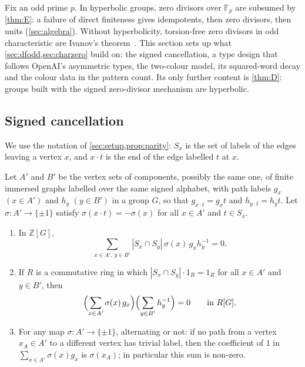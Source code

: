 \documentclass[11pt]{article}
\theoremstyle{definition}
\theoremstyle{plain}
\newcommand{\F}{\mathbb{F}}
\newcommand{\Z}{\mathbb{Z}}
\begin{document}
Fix an odd prime $p$. In hyperbolic groups, zero divisors over $\F_p$ are subsumed by \cref{thm:E}: a failure of direct finiteness gives idempotents, then zero divisors, then units (\cref{sec:algebra}). Without hyperbolicity, torsion-free zero divisors in odd characteristic are Ivanov's theorem~\cite[Thm.~1.1]{Ivanov2026}. This section sets up what \cref{sec:dfodd,sec:charzero} build on: the signed cancellation, a type design that follows OpenAI's asymmetric types, the two-colour model, its squared-word decay and the colour data in the pattern count. Its only further content is \cref{thm:D}: groups built with the signed zero-divisor mechanism are hyperbolic.

\subsection{Signed cancellation}
We use the notation of \cref{sec:setup,prop:parity}: $S_x$ is the set of labels of the edges leaving a vertex $x$, and $x\cdot t$ is the end of the edge labelled $t$ at $x$.

\begin{lemma}\label{lem:handshake}
Let $A'$ and $B'$ be the vertex sets of components, possibly the same one, of finite immersed graphs labelled over the same signed alphabet, with path labels $g_x$ $(x\in A')$ and $h_y$ $(y\in B')$ in a group $G$, so that $g_{x\cdot t}=g_xt$ and $h_{y\cdot t}=h_yt$. Let $\sigma\colon A'\to\{\pm1\}$ satisfy $\sigma(x\cdot t)=-\sigma(x)$ for all $x\in A'$ and $t\in S_x$.
\begin{enumerate}[label=\textup{(\alph*)},itemsep=0pt]
\item In $\Z[G]$,
\begin{equation}\label{eq:handshake}
\sum_{x\in A',\,y\in B'}|S_x\cap S_y|\,\sigma(x)\,g_xh_y^{-1}=0 .
\end{equation}
\item If $R$ is a commutative ring in which $|S_x\cap S_y|\cdot1_R=1_R$ for all $x\in A'$ and $y\in B'$, then
\[
\Bigl(\sum_{x\in A'}\sigma(x)\,g_x\Bigr)\Bigl(\sum_{y\in B'}h_y^{-1}\Bigr)=0\qquad\text{in }R[G].
\]
\item For any map $\sigma\colon A'\to\{\pm1\}$, alternating or not: if no path from a vertex $x_A\in A'$ to a different vertex has trivial label, then the coefficient of $1$ in $\sum_{x\in A'}\sigma(x)g_x$ is $\sigma(x_A)$; in particular this sum is non-zero.
\end{enumerate}
\end{lemma}
\end{document}
